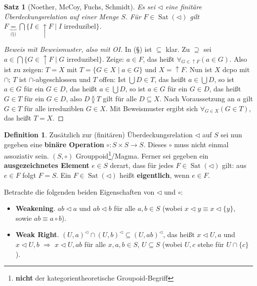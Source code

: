 \documentclass[headsepline=true,DIV=11]{scrartcl}
\newtheorem*{theorem}{Satz}
\theoremstyle{definition}
\newtheorem*{definition}{Definition}
\newenvironment{gelaber}{}{}
\newcommand{\Sat}{\operatorname{Sat}}
\begin{document}
\begin{theorem}[Noether, McCoy, Fuchs, Schmidt]
  Es sei $\lhd$ eine finitäre Überdeckungsrelation auf einer Menge $S$. Für $F\in\Sat(\lhd)$ gilt $F\underbrace{=}_{\mbox{(§)}}\bigcap\{I\in\uparrow
  F\mid I\mbox{ irreduzibel}\}$.
\end{theorem}

\begin{proof}[Beweis mit Beweismuster, also mit OI]
  In (§) ist $\subseteq$ klar. Zu $\supseteq$ sei $a\in\bigcap\{G\in\uparrow F\mid G\mbox{ irreduzibel}\}$. Zeige: $a\in F$, das heißt
  $\forall_{G\in\uparrow F}(a\in G)$. Also ist zu zeigen: $T=X$ mit $T=\{G\in X\mid a\in G\}$ und $X=\uparrow F$. Nun ist $X$ dcpo mit $\cap$; $T$ ist
  $\cap$-abgeschlossen und $T$ offen: Ist $\bigcup D\in T$, das heißt $a\in\bigcup D$, so ist $a\in G$ für ein $G\in D$, das heißt $a\in\bigcup D$, so
  ist $a\in G$ für ein $G\in D$, das heißt $G\in T$ für ein $G\in D$, also $D\between T$ gilt für alle $D\subseteq X$. Nach Voraussetzung an $a$ gilt
  $G\in T$ für alle irreduziblen $G\in X$. Mit Beweismuster ergibt sich $\forall_{G\in X}(G\in T)$, das heißt $T=X$.
\end{proof}

\begin{definition}
  Zusätzlich zur (finitären) Überdeckungsrelation $\lhd$ auf $S$ sei nun gegeben eine {\bf binäre Operation} $\circ:S\times S\rightarrow S$. Dieses
  $\circ$ muss nicht einmal assoziativ sein. $(S,\circ)$ Grouppoid\footnote{{\bf nicht} der kategorientheoretische Groupoid-Begriff}/Magma. Ferner sei
  gegeben ein {\bf ausgezeichnetes Element} $e\in S$ derart, dass für jedes $F\in\Sat(\lhd)$ gilt: aus $e\in F$ folgt $F=S$. Ein $F\in\Sat(\lhd)$
  heißt {\bf eigentlich}, wenn $e\in F$.
\end{definition}

\begin{gelaber}
  Betrachte die folgenden beiden Eigenschaften von $\lhd$ und $\circ$:
  \begin{itemize}
    \item {\bf Weakening}. $ab\lhd a$ und $ab\lhd b$ für alle $a,b\in S$ (wobei $x\lhd y \equiv x\lhd\{y\}$, sowie $ab\equiv a\circ b$).
    \item {\bf Weak Right}. $(U,a)^\lhd\cap (U,b)^\lhd\subseteq (U,ab)^\lhd$, das heißt $x\lhd U, a$ und $x\lhd U,b$ $\Rightarrow$ $x\lhd U,ab$ für
      alle $x,a,b\in S$, $U\subseteq S$ (wobei $U,c$ stehe für $U\cap\{c\}$).
  \end{itemize}
\end{gelaber}
\end{document}
